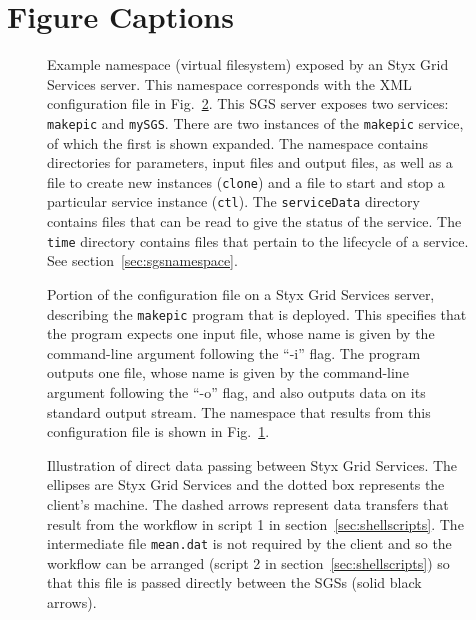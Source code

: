 \documentclass[a4paper]{article}
\begin{document}
%
%


\newpage
\singlespace

\section*{Figure Captions}

\begin{figure}[h]
\caption{Example namespace (virtual filesystem) exposed by an Styx Grid Services server.  This namespace corresponds with the XML configuration file in Fig.~\ref{fig:makepicconfig}.  This SGS server exposes two services: \texttt{makepic} and \texttt{mySGS}.  There are two instances of the \texttt{makepic} service, of which the first is shown expanded.  The namespace contains directories for parameters, input files and output files, as well as a file to create new instances (\texttt{clone}) and a file to start and stop a particular service instance (\texttt{ctl}).  The \texttt{serviceData} directory contains files that can be read to give the status of the service.  The \texttt{time} directory contains files that pertain to the lifecycle of a service.  See section~\ref{sec:sgsnamespace}.}\label{fig:sgsnamespace}
\end{figure}

\begin{figure}[h]
\caption{Portion of the configuration file on a Styx Grid Services server, describing the \texttt{makepic} program that is deployed.  This specifies that the program expects one input file, whose name is given by the command-line argument following the ``-i'' flag.  The program outputs one file, whose name is given by the command-line argument following the ``-o'' flag, and also outputs data on its standard output stream.  The namespace that results from this configuration file is shown in Fig.~\ref{fig:sgsnamespace}.}
\label{fig:makepicconfig}
\end{figure}

\begin{figure}[h]
\caption{Illustration of direct data passing between Styx Grid Services.  The ellipses are Styx Grid Services and the dotted box represents the client's machine.  The dashed arrows represent data transfers that result from the workflow in script 1 in section~\ref{sec:shellscripts}.  The intermediate file \texttt{mean.dat} is not required by the client and so the workflow can be arranged (script 2 in section~\ref{sec:shellscripts}) so that this file is passed directly between the SGSs (solid black arrows).}\label{fig:datapassing}
\end{figure}
\end{document}
